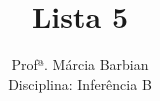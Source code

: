 \documentclass[10pt,brazil,addpoints]{exam}
\begin{document}
\title{Lista 5}


\author{
  Profª. Márcia Barbian \\
  Disciplina: Inferência B\\
  \date{}
}


\maketitle
\end{document}
